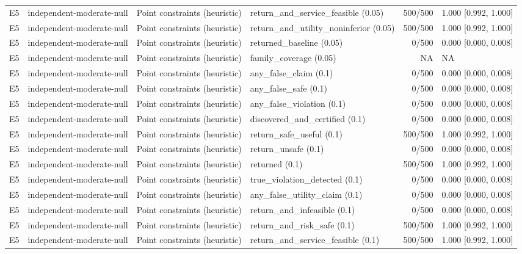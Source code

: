 \begin{longtable}{p{.04\linewidth}p{.18\linewidth}p{.19\linewidth}p{.16\linewidth}r p{.21\linewidth}}
E5 & independent-moderate-null & Point constraints (heuristic) & return\_and\_service\_feasible (0.05) & 500/500 & 1.000 [0.992, 1.000]\\
E5 & independent-moderate-null & Point constraints (heuristic) & return\_and\_utility\_noninferior (0.05) & 500/500 & 1.000 [0.992, 1.000]\\
E5 & independent-moderate-null & Point constraints (heuristic) & returned\_baseline (0.05) & 0/500 & 0.000 [0.000, 0.008]\\
E5 & independent-moderate-null & Point constraints (heuristic) & family\_coverage (0.05) & NA & NA\\
E5 & independent-moderate-null & Point constraints (heuristic) & any\_false\_claim (0.1) & 0/500 & 0.000 [0.000, 0.008]\\
E5 & independent-moderate-null & Point constraints (heuristic) & any\_false\_safe (0.1) & 0/500 & 0.000 [0.000, 0.008]\\
E5 & independent-moderate-null & Point constraints (heuristic) & any\_false\_violation (0.1) & 0/500 & 0.000 [0.000, 0.008]\\
E5 & independent-moderate-null & Point constraints (heuristic) & discovered\_and\_certified (0.1) & 0/500 & 0.000 [0.000, 0.008]\\
E5 & independent-moderate-null & Point constraints (heuristic) & return\_safe\_useful (0.1) & 500/500 & 1.000 [0.992, 1.000]\\
E5 & independent-moderate-null & Point constraints (heuristic) & return\_unsafe (0.1) & 0/500 & 0.000 [0.000, 0.008]\\
E5 & independent-moderate-null & Point constraints (heuristic) & returned (0.1) & 500/500 & 1.000 [0.992, 1.000]\\
E5 & independent-moderate-null & Point constraints (heuristic) & true\_violation\_detected (0.1) & 0/500 & 0.000 [0.000, 0.008]\\
E5 & independent-moderate-null & Point constraints (heuristic) & any\_false\_utility\_claim (0.1) & 0/500 & 0.000 [0.000, 0.008]\\
E5 & independent-moderate-null & Point constraints (heuristic) & return\_and\_infeasible (0.1) & 0/500 & 0.000 [0.000, 0.008]\\
E5 & independent-moderate-null & Point constraints (heuristic) & return\_and\_risk\_safe (0.1) & 500/500 & 1.000 [0.992, 1.000]\\
E5 & independent-moderate-null & Point constraints (heuristic) & return\_and\_service\_feasible (0.1) & 500/500 & 1.000 [0.992, 1.000]\\

\end{longtable}
